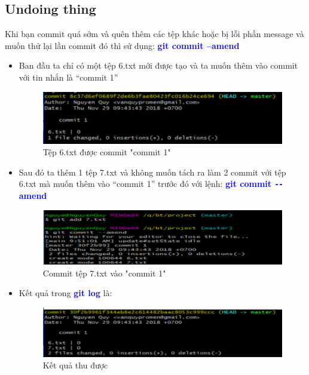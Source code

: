 \documentclass[12pt,a4paper]{report}
\begin{document}
\subsection{Undoing thing}
Khi bạn commit quá sớm và quên thêm các tệp khác hoặc bị lỗi phần message và muốn thử lại lần commit đó thì sử dụng: \textcolor{blue}{\bf git commit –amend}
\begin{itemize}
\item Ban đầu ta chỉ có một tệp 6.txt mới được tạo và ta muốn thêm vào commit với tin nhắn là “commit 1”

\begin{figure}[!ht]
	\centering
	\includegraphics[width=0.8\linewidth]{screenshot026}
\caption{Tệp 6.txt được commit "commit 1"}
	\label{fig:screenshot026}
\end{figure}

\item Sau đó ta thêm 1 tệp 7.txt và không muốn tách ra làm 2 commit với tệp 6.txt mà muốn thêm vào “commit 1” trước đó với lệnh: \textcolor{blue}{\bf git commit \texttt{-{}-}amend}

\begin{figure}[!ht]
	\centering
	\includegraphics[width=0.8\linewidth]{screenshot027}
\caption{Commit tệp 7.txt vào "commit 1"}
	\label{fig:screenshot027}
	\end{figure}

\item Kết quả trong \textcolor{blue}{\bf git log} là:

\begin{figure}[!ht]
	\centering
	\includegraphics[width=0.8\linewidth]{screenshot028}
	\caption{Kết quả thu được}
	\label{fig:screenshot028}
	\end{figure}
\end{itemize}
\end{document}

